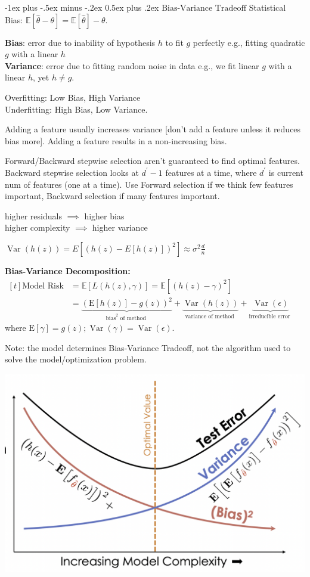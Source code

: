 \documentclass[10pt,landscape]{article}
\makeatletter
\DeclareMathOperator*{\Var}{Var}
\def\E{\mathbb{E}}
\renewcommand{\section}{\@startsection{section}{1}{0mm}%
                                {-1ex plus -.5ex minus -.2ex}%
                                {0.5ex plus .2ex}%
                                {\normalfont\large\bfseries}}
\makeatother
\begin{document}
\begin{multicols}{3}
\section{$\boxed{\text{Bias-Variance Tradeoff}}$}
Statistical Bias: $\E[\hat\theta-\theta]=\E[\hat\theta]-\theta$.

\textbf{Bias}: error due to inability of hypothesis $h$ to fit $g$ perfectly e.g., fitting quadratic $g$ with a linear $h$\\
\textbf{Variance}: error due to fitting random noise in data
e.g., we fit linear $g$ with a linear $h$, yet $h \neq g$.

Overfitting: Low Bias, High Variance \\
Underfitting: High Bias, Low Variance.

Adding a feature usually increases variance [don’t add a feature unless it reduces bias more]. Adding a feature results in a non-increasing bias. 

Forward/Backward stepwise selection aren't guaranteed to find optimal features. Backward stepwise selection looks at $d^{\prime}-1$ features at a time, where $d^{\prime}$ is current num of features (one at a time). Use Forward selection if we think few features important, Backward selection if many features important.

higher residuals $\implies$ higher bias\\
higher complexity $\implies$ higher variance

$\Var(h(z)) = E\left[(h(z)-E[h(z)])^{2}\right] \approx \sigma^2\frac d n$

\textbf{Bias-Variance Decomposition:} \\
$\begin{aligned}[t] \text{Model Risk} &=\E[L(h(z), \gamma)]
=\E[(h(z)-\gamma)^2] \\
&=\underbrace{(\mathrm{E}[h(z)]-g(z))^{2}}_{\text {bias}^{2} \text { of method }}+\underbrace{\operatorname{Var}(h(z))}_{\text {variance of method }}+\underbrace{\operatorname{Var}(\epsilon)}_{\text {irreducible error }}
\end{aligned}$ where $\mathrm{E}[\gamma]=g(z) ; \operatorname{Var}(\gamma)=\operatorname{Var}(\epsilon)$.

Note: the model determines Bias-Variance Tradeoff, not the algorithm used to solve the model/optimization problem.

\includegraphics[height = 1.6 in]{Bias-Variance.png}


\end{multicols}
\end{document}
